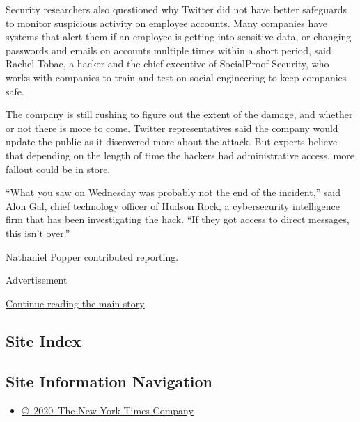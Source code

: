 Security researchers also questioned why Twitter did not have better
safeguards to monitor suspicious activity on employee accounts. Many
companies have systems that alert them if an employee is getting into
sensitive data, or changing passwords and emails on accounts multiple
times within a short period, said Rachel Tobac, a hacker and the chief
executive of SocialProof Security, who works with companies to train and
test on social engineering to keep companies safe.

The company is still rushing to figure out the extent of the damage, and
whether or not there is more to come. Twitter representatives said the
company would update the public as it discovered more about the attack.
But experts believe that depending on the length of time the hackers had
administrative access, more fallout could be in store.

``What you saw on Wednesday was probably not the end of the incident,''
said Alon Gal, chief technology officer of Hudson Rock, a cybersecurity
intelligence firm that has been investigating the hack. ``If they got
access to direct messages, this isn't over.''

Nathaniel Popper contributed reporting.

Advertisement

\protect\hyperlink{after-bottom}{Continue reading the main story}

\hypertarget{site-index}{%
\subsection{Site Index}\label{site-index}}

\hypertarget{site-information-navigation}{%
\subsection{Site Information
Navigation}\label{site-information-navigation}}

\begin{itemize}
\tightlist
\item
  \href{https://help.nytimes3xbfgragh.onion/hc/en-us/articles/115014792127-Copyright-notice}{©~2020~The
  New York Times Company}
\end{itemize}

